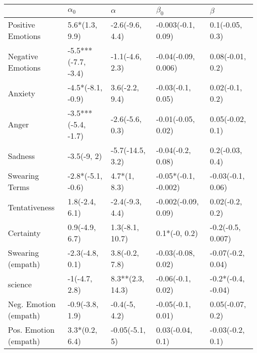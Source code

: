 \begin{tabular}{lllll}
\toprule
{} &           $\alpha_0$ &          $\alpha$ &             $\beta_0$ &             $\beta$ \\
\midrule
Positive Emotions     &       5.6*(1.3, 9.9) &   -2.6(-9.6, 4.4) &    -0.003(-0.1, 0.09) &     0.1(-0.05, 0.3) \\
Negative Emotions     &  -5.5***(-7.7, -3.4) &   -1.1(-4.6, 2.3) &   -0.04(-0.09, 0.006) &    0.08(-0.01, 0.2) \\
Anxiety               &    -4.5*(-8.1, -0.9) &    3.6(-2.2, 9.4) &     -0.03(-0.1, 0.05) &     0.02(-0.1, 0.2) \\
Anger                 &  -3.5***(-5.4, -1.7) &   -2.6(-5.6, 0.3) &    -0.01(-0.05, 0.02) &    0.05(-0.02, 0.1) \\
Sadness               &          -3.5(-9, 2) &  -5.7(-14.5, 3.2) &     -0.04(-0.2, 0.08) &     0.2(-0.03, 0.4) \\
Swearing Terms        &    -2.8*(-5.1, -0.6) &      4.7*(1, 8.3) &  -0.05*(-0.1, -0.002) &   -0.03(-0.1, 0.06) \\
Tentativeness         &       1.8(-2.4, 6.1) &   -2.4(-9.3, 4.4) &   -0.002(-0.09, 0.09) &     0.02(-0.2, 0.2) \\
Certainty             &       0.9(-4.9, 6.7) &   1.3(-8.1, 10.7) &         0.1*(-0, 0.2) &   -0.2(-0.5, 0.007) \\
Swearing (empath)     &      -2.3(-4.8, 0.1) &    3.8(-0.2, 7.8) &    -0.03(-0.08, 0.02) &   -0.07(-0.2, 0.04) \\
science               &        -1(-4.7, 2.8) &  8.3**(2.3, 14.3) &     -0.06(-0.1, 0.02) &  -0.2*(-0.4, -0.04) \\
Neg. Emotion (empath) &      -0.9(-3.8, 1.9) &     -0.4(-5, 4.2) &     -0.05(-0.1, 0.01) &    0.05(-0.07, 0.2) \\
Pos. Emotion (empath) &       3.3*(0.2, 6.4) &    -0.05(-5.1, 5) &      0.03(-0.04, 0.1) &    -0.03(-0.2, 0.1) \\
\bottomrule
\end{tabular}
